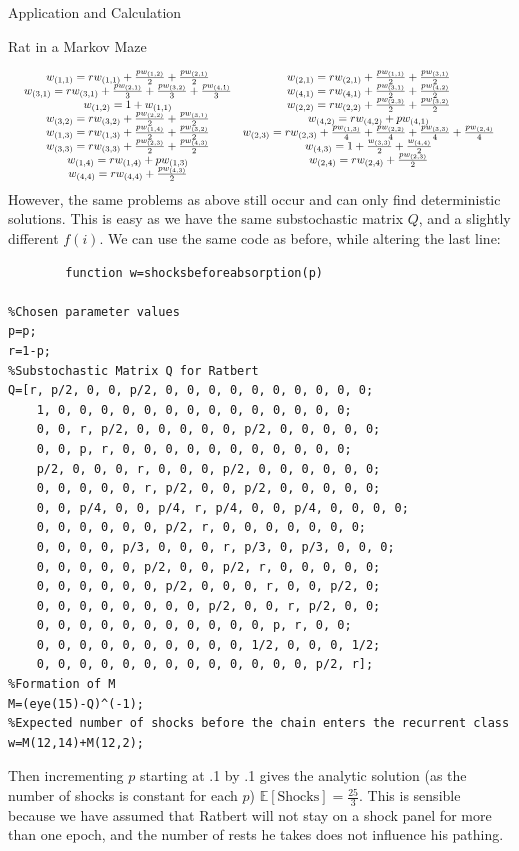 \documentclass[12pt]{article}
\newcommand\scalemath[2]{\scalebox{#1}{\mbox{\ensuremath{\displaystyle #2}}}}
\numberwithin{equation}{section}
\begin{document}
\begin{section}{Application and Calculation}
\begin{subsection}{Rat in a Markov Maze}
\begin{enumerate}
\[\scalemath{0.8}{\begin{array}{cc}w_{(1,1)}=rw_{(1,1)}+\frac{pw_{(1,2)}}{2}+\frac{pw_{(2,1)}}{2}&w_{(2,1)}=rw_{(2,1)}+\frac{pw_{(1,1)}}{2}+\frac{pw_{(3,1)}}{2}\\
        w_{(3,1)}=rw_{(3,1)}+\frac{pw_{(2,1)}}{3}+\frac{pw_{(3,2)}}{3}+\frac{pw_{(4,1)}}{3}&   w_{(4,1)}=rw_{(4,1)}+\frac{pw_{(3,1)}}{2}+\frac{pw_{(4,2)}}{2}\\w_{(1,2)}=1+w_{(1,1)}&w_{(2,2)}=rw_{(2,2)}+\frac{pw_{(2,3)}}{2}+\frac{pw_{(3,2)}}{2}\\
        w_{(3,2)}=rw_{(3,2)}+\frac{pw_{(2,2)}}{2}+\frac{pw_{(3,1)}}{2}&w_{(4,2)}=rw_{(4,2)}+pw_{(4,1)}\\w_{(1,3)}=rw_{(1,3)}+\frac{pw_{(1,4)}}{2}+\frac{pw_{(3,2)}}{2}&
        w_{(2,3)}=rw_{(2,3)}+\frac{pw_{(1,3)}}{4}+\frac{pw_{(2,2)}}{4}+\frac{pw_{(3,3)}}{4}+\frac{pw_{(2,4)}}{4}\\w_{(3,3)}=rw_{(3,3)}+\frac{pw_{(2,3)}}{2}+\frac{pw_{(4,3)}}{2}&w_{(4,3)}=1+\frac{w_{(3,3)}}{2}+\frac{w_{(4,4)}}{2}\\
        w_{(1,4)}=rw_{(1,4)}+pw_{(1,3)}&w_{(2,4)}=rw_{(2,4)}+\frac{pw_{(2,3)}}{2}\\w_{(4,4)}=rw_{(4,4)}+\frac{pw_{(4,3)}}{2}\end{array}}\]
        However, the same problems as above still occur and can only find deterministic solutions.        This is easy as we have the same substochastic matrix $Q$, and a slightly different $f(i)$. We can use the same code as before, while altering the last line:
        \begin{lstlisting}
        function w=shocksbeforeabsorption(p)

%Chosen parameter values
p=p;
r=1-p;
%Substochastic Matrix Q for Ratbert
Q=[r, p/2, 0, 0, p/2, 0, 0, 0, 0, 0, 0, 0, 0, 0, 0;
    1, 0, 0, 0, 0, 0, 0, 0, 0, 0, 0, 0, 0, 0, 0;
    0, 0, r, p/2, 0, 0, 0, 0, 0, p/2, 0, 0, 0, 0, 0;
    0, 0, p, r, 0, 0, 0, 0, 0, 0, 0, 0, 0, 0, 0;
    p/2, 0, 0, 0, r, 0, 0, 0, p/2, 0, 0, 0, 0, 0, 0;
    0, 0, 0, 0, 0, r, p/2, 0, 0, p/2, 0, 0, 0, 0, 0;
    0, 0, p/4, 0, 0, p/4, r, p/4, 0, 0, p/4, 0, 0, 0, 0;
    0, 0, 0, 0, 0, 0, p/2, r, 0, 0, 0, 0, 0, 0, 0;
    0, 0, 0, 0, p/3, 0, 0, 0, r, p/3, 0, p/3, 0, 0, 0;
    0, 0, 0, 0, 0, p/2, 0, 0, p/2, r, 0, 0, 0, 0, 0;
    0, 0, 0, 0, 0, 0, p/2, 0, 0, 0, r, 0, 0, p/2, 0;
    0, 0, 0, 0, 0, 0, 0, 0, p/2, 0, 0, r, p/2, 0, 0;
    0, 0, 0, 0, 0, 0, 0, 0, 0, 0, 0, p, r, 0, 0;
    0, 0, 0, 0, 0, 0, 0, 0, 0, 0, 1/2, 0, 0, 0, 1/2;
    0, 0, 0, 0, 0, 0, 0, 0, 0, 0, 0, 0, 0, p/2, r];
%Formation of M
M=(eye(15)-Q)^(-1);
%Expected number of shocks before the chain enters the recurrent class
w=M(12,14)+M(12,2);
\end{lstlisting}
Then incrementing $p$ starting at .1 by .1 gives the analytic solution (as the number of shocks is constant for each $p$) $\mathbb{E}[\text{Shocks}]=\frac{25}{3}$. This is sensible because we have assumed that Ratbert will not stay on a shock panel for more than one epoch, and the number of rests he takes does not influence his pathing.


\end{enumerate}
\end{subsection}
\end{section}
\end{document}
